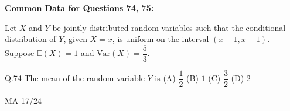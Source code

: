 \documentclass{article}
\begin{document}
																																																																																																																			       \vspace{1em}

																																																																																																																			       \textbf{Common Data for Questions 74, 75:}

																																																																																																																			       Let $X$ and $Y$ be jointly distributed random variables such that the conditional distribution of $Y$, given $X = x$, is uniform on the interval $(x - 1, x + 1)$. Suppose $\mathbb{E}(X) = 1$ and $\text{Var}(X) = \dfrac{5}{3}$.

																																																																																																																			       \vspace{1em}

																																																																																																																			       Q.74 \quad The mean of the random variable $Y$ is
																																																																																																																			       \newline
																																																																																																																			       (A) $\dfrac{1}{2}$ \hspace{2cm} (B) $1$ \hspace{2cm} (C) $\dfrac{3}{2}$ \hspace{2cm} (D) $2$
																																																																																																																			       \vspace{1em} \newline
																																																																																																																			       \vspace{5em}
																																																																																																																			       \begin{center}
																																																																																																																			           {MA 17/24}
																																																																																																																				   \end{center}
																																																																																																																				   \newpage
\end{document}
